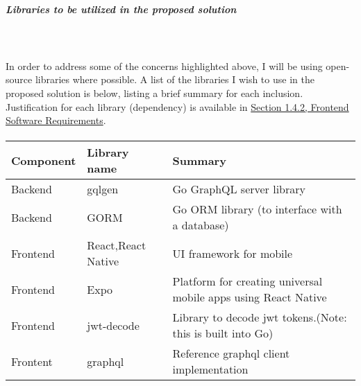 \documentclass[../../main.tex]{subfiles}
\begin{document}
\subparagraph{Libraries to be utilized in the proposed solution}

\noindent \\\\ In order to address some of the concerns highlighted above,
I will be using open-source libraries where possible.
A list of the libraries I wish to use in the proposed solution is below,
listing a brief summary for each inclusion.
Justification for each library (dependency) is available in
\underline{Section 1.4.2, Frontend Software Requirements}.

\paragraph{} %

\begin{tabular}{ |p{}|p{}|p{}| }
    \hline
    \textbf{Component} & \textbf{Library name}       & \textbf{Summary}                                                    \\
    \hline
    Backend            & gqlgen                      & Go GraphQL server library                                           \\
    \hline
    Backend            & GORM                        & Go ORM library (to interface with a database)                       \\
    \hline
    Frontend           & React,\newline React Native & UI framework for mobile                                             \\
    \hline
    Frontend           & Expo                        & Platform for creating universal mobile apps using React Native      \\
    \hline
    Frontend           & jwt-decode                  & Library to decode jwt tokens.\newline (Note: this is built into Go) \\
    \hline
    Frontent           & graphql                     & Reference graphql client implementation                             \\
    \hline
\end{tabular}
\end{document}
